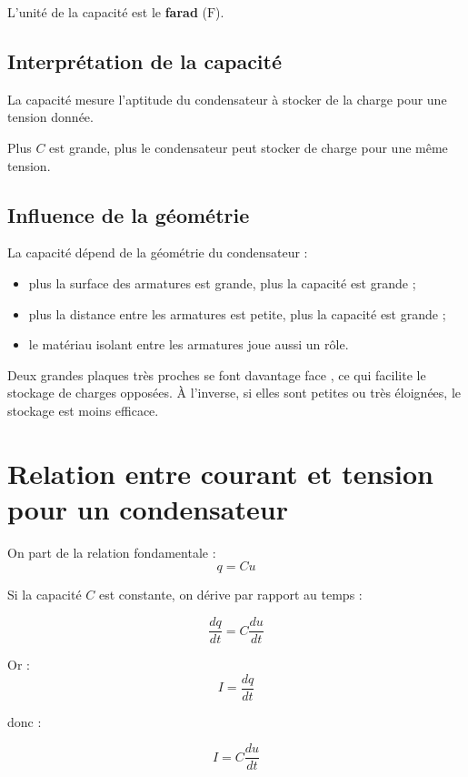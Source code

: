 \documentclass[11pt,a4paper]{article}
\begin{document}
L'unité de la capacité est le \textbf{farad} (\(\text{F}\)).

\subsection{Interprétation de la capacité}

\begin{interpretation}
La capacité mesure l'aptitude du condensateur à stocker de la charge pour une tension donnée.

Plus \(C\) est grande, plus le condensateur peut stocker de charge pour une même tension.
\end{interpretation}

\subsection{Influence de la géométrie}

La capacité dépend de la géométrie du condensateur :
\begin{itemize}
    \item plus la surface des armatures est grande, plus la capacité est grande ;
    \item plus la distance entre les armatures est petite, plus la capacité est grande ;
    \item le matériau isolant entre les armatures joue aussi un rôle.
\end{itemize}

\begin{analogie}
Deux grandes plaques très proches \og se font davantage face \fg{}, ce qui facilite le stockage de charges opposées. À l'inverse, si elles sont petites ou très éloignées, le stockage est moins efficace.
\end{analogie}

\section{Relation entre courant et tension pour un condensateur}

On part de la relation fondamentale :
\[
q = Cu
\]

Si la capacité \(C\) est constante, on dérive par rapport au temps :

\[
\frac{dq}{dt} = C \frac{du}{dt}
\]

Or :
\[
I = \frac{dq}{dt}
\]

donc :

\[
I = C \frac{du}{dt}
\]
\end{document}
